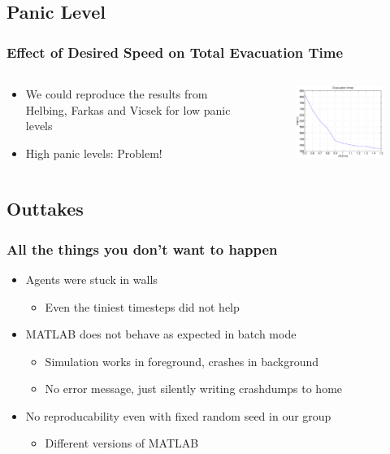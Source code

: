 \documentclass{beamer}
\begin{document}
\subsection{Panic Level}
\begin{frame}
	\frametitle{Effect of Desired Speed on Total Evacuation Time}
	\begin{columns}
		\begin{column}{5cm}
			\begin{itemize}
				\item We could reproduce the results from Helbing, Farkas and Vicsek for low panic levels
				\item High panic levels: Problem!
			\end{itemize}
		\end{column}
		\begin{column}{7cm}
			\begin{figure}
				\includegraphics[width=7cm]{images/evactimes1to11.eps}
			\end{figure}
		\end{column}
	\end{columns}
\end{frame}

\subsection{Outtakes}

\begin{frame}
	\frametitle{All the things you don't want to happen}
	\begin{itemize}
		\item Agents were stuck in walls
		\begin{itemize}
			\item Even the tiniest timesteps did not help
		\end{itemize}
		\item MATLAB does not behave as expected in batch mode
		\begin{itemize}
			\item Simulation works in foreground, crashes in background
			\item No error message, just silently writing crashdumps to home
		\end{itemize}
		\item No reproducability even with fixed random seed in our group
		\begin{itemize}
			\item Different versions of MATLAB
		\end{itemize}
	\end{itemize}
\end{frame}
\end{document}
